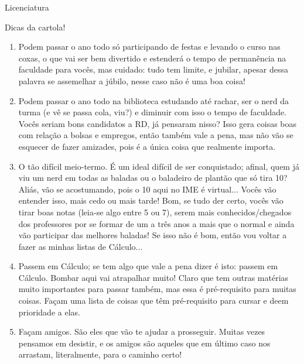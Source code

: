 \begin{subsecao}{Licenciatura}
\begin{subsubsecao}{Dicas da cartola!}
\begin{enumerate}
\item Podem passar o ano todo só participando de festas e levando o curso nas
  coxas, o que vai ser bem divertido e estenderá o tempo de permanência na
  faculdade para vocês, mas cuidado: tudo tem limite, e jubilar, apesar dessa
  palavra se assemelhar a júbilo, nesse caso não é uma boa coisa!
\item Podem passar o ano todo na biblioteca estudando até rachar, ser o nerd da
  turma (e vê se passa cola, viu?) e diminuir com isso o tempo de faculdade.
  Vocês seriam bons candidatos a RD, já pensaram nisso? Isso gera coisas boas
  com relação a bolsas e empregos, então também vale a pena, mas não vão se
  esquecer de fazer amizades, pois é a única coisa que realmente importa.
\item O tão difícil meio-termo. É um ideal difícil de ser conquistado; afinal,
  quem já viu um nerd em todas as baladas ou o baladeiro de plantão que só tira
  10? Aliás, vão se acostumando, pois o 10 aqui no IME é virtual... Vocês vão
  entender isso, mais cedo ou mais tarde! Bom, se tudo der certo, vocês vão
  tirar boas notas (leia-se algo entre 5 ou 7), serem mais conhecidos/chegados
  dos professores por se formar de um a três anos a mais que o normal e ainda
  vão participar das melhores baladas! Se isso não é bom, então vou voltar a
  fazer as minhas listas de Cálculo...
\item Passem em Cálculo; se tem algo que vale a pena dizer é isto: passem em
  Cálculo. Bombar aqui vai atrapalhar muito! Claro que tem outras matérias muito
  importantes para passar também, mas essa é pré-requisito para muitas coisas.
  Façam uma lista de coisas que têm pré-requisito para cursar e deem prioridade
  a elas. 
\item Façam amigos. São eles que vão te ajudar a prosseguir. Muitas vezes
  pensamos em desistir, e os amigos são aqueles que em último caso nos arrastam,
  literalmente, para o caminho certo!

\end{enumerate}

\end{subsubsecao}

\end{subsecao}
